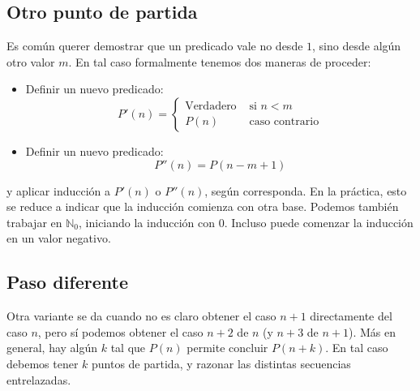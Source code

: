 \subsection{Otro punto de partida}
\label{sec:induccion-partida-diferente}

  Es común querer demostrar que un predicado vale no desde \(1\),
  sino desde algún otro valor \(m\).
  En tal caso formalmente tenemos dos maneras de proceder:
  \begin{itemize}
  \item
    Definir un nuevo predicado:
    \begin{equation*}
      P'(n)
	=
	\begin{cases}
	  \text{Verdadero} & \text{\ si\ \(n < m\)} \\
	  P(n)		   & \text{\ caso contrario}
	\end{cases}
    \end{equation*}
  \item
    Definir un nuevo predicado:
    \begin{equation*}
      P''(n)
	= P(n - m + 1)
    \end{equation*}
  \end{itemize}
  y aplicar inducción a \(P'(n)\) o \(P''(n)\),
  según corresponda.
  En la práctica,
  esto se reduce a indicar que la inducción comienza con otra base.
  Podemos también trabajar en \(\mathbb{N}_0\),
  iniciando la inducción con \(0\).
  Incluso puede comenzar la inducción en un valor negativo.

\subsection{Paso diferente}
\label{sec:induccion-paso-diferente}

  Otra variante se da cuando no es claro obtener el caso \(n + 1\)
  directamente del caso \(n\),
  pero sí podemos obtener el caso \(n + 2\) de \(n\)
  (y \(n + 3\) de \(n + 1\)).
  Más en general,
  hay algún \(k\) tal que \(P(n)\) permite concluir \(P(n + k)\).
  En tal caso debemos tener \(k\) puntos de partida,
  y razonar las distintas secuencias entrelazadas.


